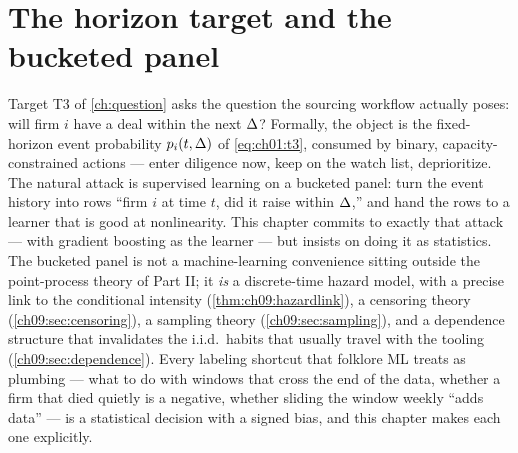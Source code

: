 
\section{The horizon target and the bucketed panel}\label{ch09:sec:panel}

Target T3 of \cref{ch:question} asks the question the sourcing workflow
actually poses: will firm $i$ have a deal within the next $\Delta$?
Formally, the object is the fixed-horizon event probability
$p_i(t,\Delta)$ of \cref{eq:ch01:t3}, consumed by binary,
capacity-constrained actions --- enter diligence now, keep on the watch
list, deprioritize. The natural attack is supervised learning on a
bucketed panel: turn the event history into rows ``firm $i$ at time $t$,
did it raise within $\Delta$,'' and hand the rows to a learner that is
good at nonlinearity. This chapter commits to exactly that attack --- with
gradient boosting as the learner --- but insists on doing it as
statistics. The bucketed panel is not a machine-learning convenience
sitting outside the point-process theory of Part II; it \emph{is} a
discrete-time hazard model, with a precise link to the conditional
intensity (\cref{thm:ch09:hazardlink}), a censoring theory
(\cref{ch09:sec:censoring}), a sampling theory
(\cref{ch09:sec:sampling}), and a dependence structure that invalidates
the i.i.d.\ habits that usually travel with the tooling
(\cref{ch09:sec:dependence}). Every labeling shortcut that folklore ML
treats as plumbing --- what to do with windows that cross the end of the
data, whether a firm that died quietly is a negative, whether sliding the
window weekly ``adds data'' --- is a statistical decision with a signed
bias, and this chapter makes each one explicitly.

